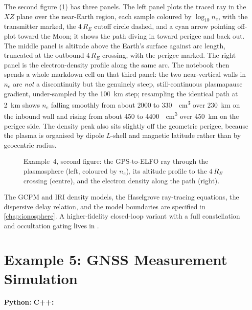 The second figure (\cref{fig:tut-ex4-ray}) has three panels. The left panel
plots the traced ray in the $XZ$ plane over the near-Earth region, each sample
coloured by $\log_{10} n_e$, with the transmitter marked, the $4\,R_E$ cutoff
circle dashed, and a cyan arrow pointing off-plot toward the Moon; it shows the
path diving in toward perigee and back out. The middle panel is altitude above
the Earth's surface against arc length, truncated at the outbound $4\,R_E$
crossing, with the perigee marked. The right panel is the electron-density
profile along the same arc. The notebook then spends a whole markdown cell on
that third panel: the two near-vertical walls in $n_e$ are \emph{not} a
discontinuity but the genuinely steep, still-continuous plasmapause gradient,
under-sampled by the \SI{100}{\kilo\meter} step; resampling the identical path
at \SI{2}{\kilo\meter} shows $n_e$ falling smoothly from about 2000 to
\SI{330}{\per\centi\meter\cubed} over \SI{230}{\kilo\meter} on the inbound wall
and rising from about 450 to \SI{4400}{\per\centi\meter\cubed} over
\SI{450}{\kilo\meter} on the perigee side. The density peak also sits slightly
off the geometric perigee, because the plasma is organised by dipole $L$-shell
and magnetic latitude rather than by geocentric radius.

\begin{figure}[htbp]
  \centering
  \caption{Example~4, second figure: the GPS-to-ELFO ray through the
           plasmasphere (left, coloured by $n_e$), its altitude profile to the
           $4\,R_E$ crossing (centre), and the electron density along the path
           (right).}
  \label{fig:tut-ex4-ray}
\end{figure}

The GCPM and IRI density models, the Haselgrove ray-tracing equations, the
dispersive delay relation, and the model boundaries are specified in
\cref{chap:ionosphere}. A higher-fidelity closed-loop variant with a full
constellation and occultation gating lives in
.

\section{Example 5: GNSS Measurement Simulation}
\label{sec:tut-ex5}

\textbf{Python:}  \quad
\textbf{C++:} 

